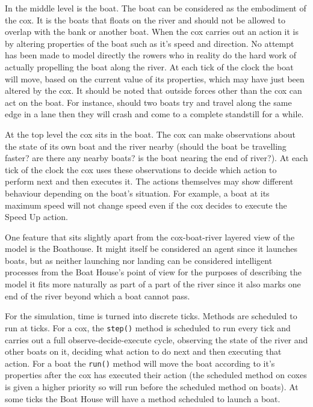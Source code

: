    In the middle level is the boat. The boat can be considered as the embodiment of the cox. It is the boats that floats on the river and should not be allowed to overlap with the bank or another boat. When the cox carries out an action it is by altering properties of the boat such as it's speed and direction. No attempt has been made to model directly the rowers who in reality do the hard work of actually propelling the boat along the river. At each tick of the clock the boat will move, based on the current value of its properties, which may have just been altered by the cox. It should be noted that outside forces other than the cox can act on the boat. For instance, should two boats try and travel along the same edge in a lane then they will crash and come to a complete standstill for a while.
    
    At the top level the cox sits in the boat. The cox can make observations about the state of its own boat and the river nearby (should the boat be travelling faster? are there any nearby boats? is the boat nearing the end of river?). At each tick of the clock the cox uses these observations to decide which action to perform next and then executes it. The actions themselves may show different behaviour depending on the boat's situation. For example, a boat at its maximum speed will not change speed even if the cox decides to execute the Speed Up action.
    
    One feature that sits slightly apart from the cox-boat-river layered view of the model is the Boathouse. It might itself be considered an agent since it launches boats, but as neither launching nor landing can be considered intelligent processes from the Boat House's point of view for the purposes of describing the model it fits more naturally as part of a part of the river since it also marks one end of the river beyond which a boat cannot pass.
    
    For the simulation, time is turned into discrete ticks. Methods are scheduled to run at ticks. For a cox, the \texttt{step()} method is scheduled to run every tick and carries out a full observe-decide-execute cycle, observing the state of the river and other boats on it, deciding what action to do next and then executing that action. For a boat the \texttt{run()} method will move the boat according to it's properties after the cox has executed their action (the scheduled method on coxes is given a higher priority so will run before the scheduled method on boats). At some ticks the Boat House will have a method scheduled to launch a boat.
    

